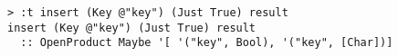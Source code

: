 \begin{repl}\begin{lstlisting}
> :t insert (Key @"key") (Just True) result
insert (Key @"key") (Just True) result
  :: OpenProduct Maybe '[ '("key", Bool), '("key", [Char])]\end{lstlisting}\end{repl}
